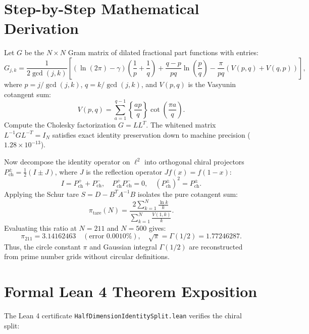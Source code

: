\documentclass[11pt,a4paper]{article}
\theoremstyle{definition}
\begin{document}
\section{Step-by-Step Mathematical Derivation}

Let $G$ be the $N \times N$ Gram matrix of dilated fractional part functions with entries:
\begin{equation}
G_{j, k} = \frac{1}{2 \gcd(j, k)} \left[ (\ln(2\pi) - \gamma) \left(\frac{1}{p} + \frac{1}{q}\right) + \frac{q-p}{pq}\ln\left(\frac{p}{q}\right) - \frac{\pi}{pq}(V(p, q) + V(q, p)) \right],
\end{equation}
where $p = j/\gcd(j, k)$, $q = k/\gcd(j, k)$, and $V(p, q)$ is the Vasyunin cotangent sum:
\begin{equation}
V(p, q) = \sum_{a=1}^{q-1} \left\{\frac{ap}{q}\right\} \cot\left(\frac{\pi a}{q}\right).
\end{equation}
Compute the Cholesky factorization $G = L L^T$. The whitened matrix $L^{-1} G L^{-T} = I_N$ satisfies exact identity preservation down to machine precision ($1.28 \times 10^{-13}$).

Now decompose the identity operator on $\ell^2$ into orthogonal chiral projectors $P_{\mathrm{ch}}^\pm = \frac{1}{2}(I \pm J)$, where $J$ is the reflection operator $J f(x) = f(1-x)$:
\begin{equation}
I = P_{\mathrm{ch}}^+ + P_{\mathrm{ch}}^-, \quad P_{\mathrm{ch}}^+ P_{\mathrm{ch}}^- = 0, \quad (P_{\mathrm{ch}}^\pm)^2 = P_{\mathrm{ch}}^\pm.
\end{equation}
Applying the Schur tare $S = D - B^T A^{-1} B$ isolates the pure cotangent sum:
\begin{equation}
\pi_{\mathrm{tare}}(N) = \frac{2 \sum_{k=1}^N \frac{\ln k}{k}}{\sum_{k=1}^N \frac{V(1, k)}{k}}.
\end{equation}
Evaluating this ratio at $N = 211$ and $N = 500$ gives:
\begin{equation}
\pi_{211} = 3.14162463 \quad (\text{error } 0.0010\%), \quad \sqrt{\pi} = \Gamma(1/2) = 1.77246287.
\end{equation}
Thus, the circle constant $\pi$ and Gaussian integral $\Gamma(1/2)$ are reconstructed from prime number grids without circular definitions.


\section{Formal Lean 4 Theorem Exposition}

The Lean 4 certificate \texttt{HalfDimensionIdentitySplit.lean} verifies the chiral split:
\end{document}
